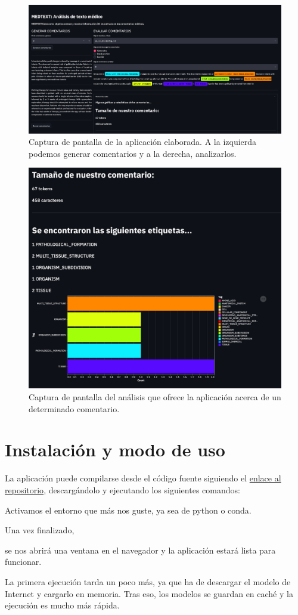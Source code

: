 \begin{figure}[h]
	\centering
	\includegraphics[width=.9\textwidth]{media/app_demo.jpeg}
	\caption{Captura de pantalla de la aplicación elaborada. A la izquierda podemos generar comentarios y a la derecha, analizarlos.}
	\label{fig:app-demo}
\end{figure}


\begin{figure}[t]
	\centering
	\includegraphics[width=.62\textwidth]{media/analysis_comment.jpeg}
	\caption{Captura de pantalla del análisis que ofrece la aplicación acerca de un determinado comentario.}
	\label{fig:analysis-comment}
\end{figure}



\section{Instalación y modo de uso}
La aplicación puede compilarse desde el código fuente siguiendo el \href{https://github.com/jesi-rgb/medical-text-analysis}{enlace al repositorio}, descargándolo y ejecutando los siguientes comandos:


Activamos el entorno que más nos guste, ya sea de python o conda.



Una vez finalizado, 


se nos abrirá una ventana en el navegador y la aplicación estará lista para funcionar.

La primera ejecución tarda un poco más, ya que ha de descargar el modelo de Internet y cargarlo en memoria. Tras eso, los modelos se guardan en caché y la ejecución es mucho más rápida.
